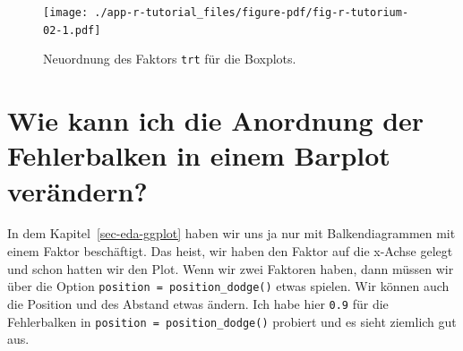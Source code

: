 \documentclass[
  letterpaper,
]{scrbook}
\begin{document}
\begin{figure}[H]

{\centering \texttt{[image: ./app-r-tutorial\_files/figure-pdf/fig-r-tutorium-02-1.pdf]}

}

\caption{\label{fig-r-tutorium-02}Neuordnung des Faktors \texttt{trt}
für die Boxplots.}

\end{figure}

\hypertarget{sec-order-error-bars}{%
\section{Wie kann ich die Anordnung der Fehlerbalken in einem Barplot
verändern?}\label{sec-order-error-bars}}

In dem Kapitel~\ref{sec-eda-ggplot} haben wir uns ja nur mit
Balkendiagrammen mit einem Faktor beschäftigt. Das heist, wir haben den
Faktor auf die x-Achse gelegt und schon hatten wir den Plot. Wenn wir
zwei Faktoren haben, dann müssen wir über die Option
\texttt{position\ =\ position\_dodge()} etwas spielen. Wir können auch
die Position und des Abstand etwas ändern. Ich habe hier \texttt{0.9}
für die Fehlerbalken in \texttt{position\ =\ position\_dodge()} probiert
und es sieht ziemlich gut aus.
\end{document}
